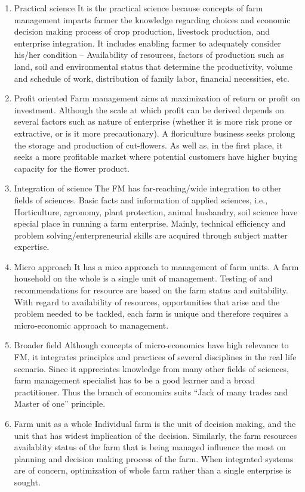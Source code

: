 \documentclass[11pt,]{book}
\theoremstyle{definition}
\theoremstyle{definition}
\theoremstyle{definition}
\theoremstyle{remark}
\begin{document}
\begin{enumerate}
\def\labelenumi{\arabic{enumi}.}
\item
  Practical science It is the practical science because concepts of farm
  management imparts farmer the knowledge regarding choices and economic
  decision making process of crop production, livestock production, and
  enterprise integration. It includes enabling farmer to adequately
  consider his/her condition -- Availability of resources, factors of
  production such as land, soil and environmental status that determine
  the productivity, volume and schedule of work, distribution of family
  labor, financial necessities, etc.
\item
  Profit oriented Farm management aims at maximization of return or
  profit on investment. Although the scale at which profit can be
  derived depends on several factors such as nature of enterprise
  (whether it is more risk prone or extractive, or is it more
  precautionary). A floriculture business seeks prolong the storage and
  production of cut-flowers. As well as, in the first place, it seeks a
  more profitable market where potential customers have higher buying
  capacity for the flower product.
\item
  Integration of science The FM has far-reaching/wide integration to
  other fields of sciences. Basic facts and information of applied
  sciences, i.e., Horticulture, agronomy, plant protection, animal
  husbandry, soil science have special place in running a farm
  enterprise. Mainly, technical efficiency and problem
  solving/enterpreneurial skills are acquired through subject matter
  expertise.
\item
  Micro approach It has a mico approach to management of farm units. A
  farm household on the whole is a single unit of management. Testing of
  and recommendations for resource are based on the farm status and
  suitability. With regard to availability of resources, opportunities
  that arise and the problem needed to be tackled, each farm is unique
  and therefore requires a micro-economic approach to management.
\item
  Broader field Although concepts of micro-economics have high relevance
  to FM, it integrates principles and practices of several disciplines
  in the real life scenario. Since it appreciates knowledge from many
  other fields of sciences, farm management specialist has to be a good
  learner and a broad practitioner. Thus the branch of economics suits
  ``Jack of many trades and Master of one'' principle.
\item
  Farm unit as a whole Individual farm is the unit of decision making,
  and the unit that has widest implication of the decision. Similarly,
  the farm resources availablity status of the farm that is being
  managed influence the most on planning and decision making process of
  the farm. When integrated systems are of concern, optimization of
  whole farm rather than a single enterprise is sought.
\end{enumerate}
\end{document}
